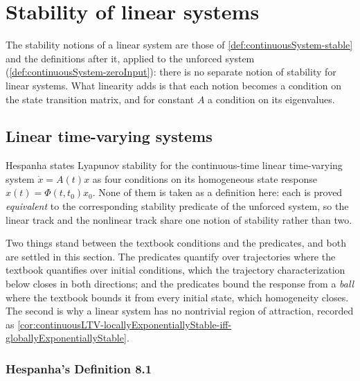 

\chapter{Stability of linear systems}

The stability notions of a linear system are those of
\cref{def:continuousSystem-stable} and the definitions after it, applied to the unforced
system (\cref{def:continuousSystem-zeroInput}): there is no separate notion of stability for
linear systems.  What linearity adds is that each notion becomes a condition on the state
transition matrix, and for constant $A$ a condition on its eigenvalues.

\section{Linear time-varying systems}

Hespanha states Lyapunov stability for the continuous-time linear time-varying system
$\dot x = A(t)x$ as four conditions on its homogeneous state response
$x(t) = \Phi(t, t_0)x_0$. None of them is taken as a definition here: each is proved
\emph{equivalent} to the corresponding stability predicate of the unforced system, so the
linear track and the nonlinear track share one notion of stability rather than two.

Two things stand between the textbook conditions and the predicates, and both are settled in
this section. The predicates quantify over trajectories where the textbook quantifies over
initial conditions, which the trajectory characterization below closes in both directions; and
the predicates bound the response from a \emph{ball} where the textbook bounds it from every
initial state, which homogeneity closes. The second is why a linear system has no nontrivial
region of attraction, recorded as
\cref{cor:continuousLTV-locallyExponentiallyStable-iff-globallyExponentiallyStable}.

\subsection{Hespanha's Definition 8.1}



